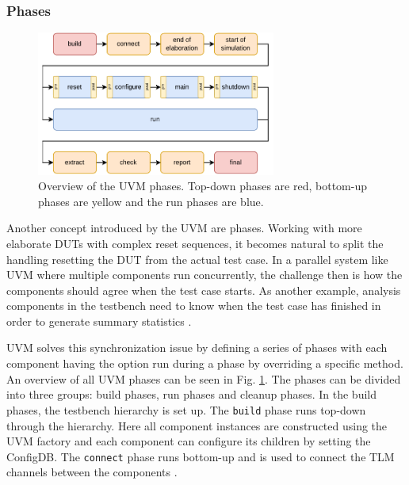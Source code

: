 \documentclass[11pt,a4paper]{report}
\newcommand{\ttt}{\texttt}
\begin{document}
\subsubsection{Phases} %

\begin{figure}
  \centering
  \includegraphics[width=0.7\textwidth]{diagrams/phases.pdf}
  \caption{Overview of the UVM phases. Top-down phases are red, bottom-up phases are yellow and the run phases are blue.}
  \label{fig:uvm_phases}
\end{figure}

Another concept introduced by the UVM are phases. Working with more elaborate DUTs with complex reset sequences, it
becomes natural to split the handling resetting the DUT from the actual test case. In a parallel system like UVM
where multiple components run concurrently, the challenge then is how the components should agree when the test case
starts. As another example, analysis components in the testbench need to know when the test case has finished in
order to generate summary statistics \cite[ch. 4.6]{mehta2018asic}.

UVM solves this synchronization issue by defining a series of phases with each component having the option run during
a phase by overriding a specific method. An overview of all UVM phases can be seen in Fig. \ref{fig:uvm_phases}. The
phases can be divided into three groups: build phases, run phases and cleanup phases. In the build phases, the
testbench hierarchy is set up. The \ttt{build} phase runs top-down through the hierarchy. Here all component
instances are constructed using the UVM factory and each component can configure its children by setting the
ConfigDB. The \ttt{connect} phase runs bottom-up and is used to connect the TLM channels between the components
\cite[ch. 4.6]{mehta2018asic}.
\end{document}
